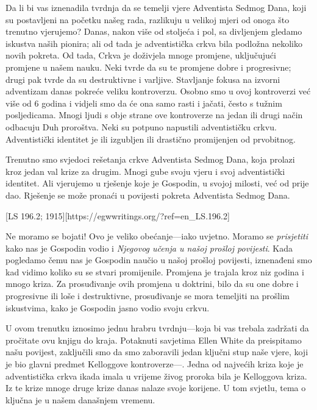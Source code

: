 Da li bi vas iznenadila tvrdnja da se temelji vjere Adventista Sedmog Dana, koji su postavljeni na početku našeg rada, razlikuju u velikoj mjeri od onoga što trenutno vjerujemo? Danas, nakon više od stoljeća i pol, sa divljenjem gledamo iskustva naših pionira; ali od tada je adventistička crkva bila podložna nekoliko novih pokreta. Od tada, Crkva je doživjela mnoge promjene, uključujući promjene u našem nauku. Neki tvrde da su te promjene dobre i progresivne; drugi pak tvrde da su destruktivne i varljive. Stavljanje fokusa na izvorni adventizam danas pokreće veliku kontroverzu. Osobno smo u ovoj kontroverzi već više od 6 godina i vidjeli smo da će ona samo rasti i jačati, često s tužnim posljedicama. Mnogi ljudi s obje strane ove kontroverze na jedan ili drugi način odbacuju Duh proroštva. Neki su potpuno napustili adventističku crkvu. Adventistički identitet je ili izgubljen ili drastično promijenjen od prvobitnog.

Trenutno smo svjedoci rešetanja crkve Adventista Sedmog Dana, koja prolazi kroz jedan val krize za drugim. Mnogi gube svoju vjeru i svoj adventistički identitet. Ali vjerujemo u rješenje koje je Gospodin, u svojoj milosti, već od prije dao. Rješenje se može pronaći u povijesti pokreta Adventista Sedmog Dana.

[LS 196.2; 1915][https://egwwritings.org/?ref=en\_LS.196.2]

Ne moramo se bojati! Ovo je veliko obećanje—iako uvjetno. Moramo se \textit{prisjetiti} kako nas je Gospodin vodio i \textit{Njegovog učenja u našoj prošloj povijesti}. Kada pogledamo čemu nas je Gospodin naučio u našoj prošloj povijesti, iznenađeni smo kad vidimo koliko su se stvari promijenile. Promjena je trajala kroz niz godina i mnogo kriza. Za prosuđivanje ovih promjena u doktrini, bilo da su one dobre i progresivne ili loše i destruktivne, prosuđivanje se mora temeljiti na prošlim iskustvima, kako je Gospodin jasno vodio svoju crkvu.

U ovom trenutku iznosimo jednu hrabru tvrdnju—koja bi vas trebala zadržati da pročitate ovu knjigu do kraja. Potaknuti savjetima Ellen White da preispitamo našu povijest, zaključili smo da smo zaboravili jedan ključni stup naše vjere, koji je bio glavni predmet Kelloggove kontroverze—. Jedna od najvećih kriza koje je adventistička crkva ikada imala u vrijeme živog proroka bila je Kelloggova kriza. Iz te krize mnoge druge krize danas nalaze svoje korijene. U tom svjetlu, tema o  ključna je u našem današnjem vremenu.

